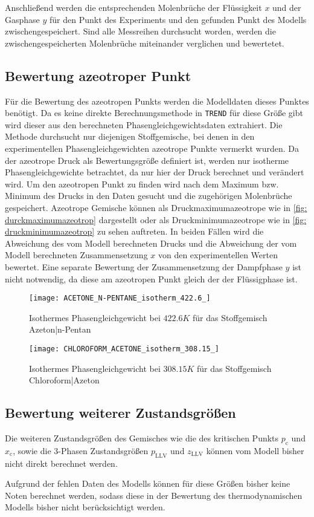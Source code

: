 \documentclass[../thesis.tex]{subfiles}
\begin{document}
Anschließend werden die entsprechenden Molenbrüche der Flüssigkeit $x$ und der Gasphase $y$ für den Punkt des Experiments und den gefunden Punkt des Modells zwischengespeichert. Sind alle Messreihen durchsucht worden, werden die zwischengespeicherten Molenbrüche miteinander verglichen und bewertetet.

\subsection{Bewertung azeotroper Punkt}

Für die Bewertung des azeotropen Punkts werden die Modelldaten dieses Punktes benötigt. Da es keine direkte Berechnungsmethode in \texttt{TREND} für diese Größe gibt wird dieser aus den berechneten Phasengleichgewichtsdaten extrahiert. Die Methode durchsucht nur diejenigen Stoffgemische, bei denen in den experimentellen Phasengleichgewichten azeotrope Punkte vermerkt wurden. Da der azeotrope Druck als Bewertungsgröße definiert ist, werden nur isotherme Phasengleichgewichte betrachtet, da nur hier der Druck berechnet und verändert wird. Um den azeotropen Punkt zu finden wird nach dem Maximum bzw. Minimum des Drucks in den Daten gesucht und die zugehörigen Molenbrüche gespeichert. Azeotrope Gemische können als Druckmaximumazeotrope wie in \autoref{fig: durckmaximumazeotrop} dargestellt oder als Druckminimumazeotrope wie in \autoref{fig: druckminimumazeotrop} zu sehen auftreten. In beiden Fällen wird die Abweichung des vom Modell berechneten Drucks und die Abweichung der vom Modell berechneten Zusammensetzung $x$ von den experimentellen Werten bewertet. Eine separate Bewertung der Zusammensetzung der Dampfphase $y$ ist nicht notwendig, da diese am azeotropen Punkt gleich der der Flüssigphase ist. 

\begin{figure}[htb]
	\centering
	\texttt{[image: ACETONE\_N-PENTANE\_isotherm\_422.6\_]}
	\caption{Isothermes Phasengleichgewicht bei $ 422$.$6 K$ für das Stoffgemisch Azeton|n-Pentan}
	\label{fig: durckmaximumazeotrop}
\end{figure}

\begin{figure}[hbt]
	\centering
	\texttt{[image: CHLOROFORM\_ACETONE\_isotherm\_308.15\_]}
	\caption{Isothermes Phasengleichgewicht bei $ 308$.$15 K$ für das Stoffgemisch Chloroform|Azeton}
	\label{fig: druckminimumazeotrop}
\end{figure}

\subsection{Bewertung weiterer Zustandsgrößen}

Die weiteren Zustandsgrößen des Gemisches wie die des kritischen Punkts $ p_{\mathrm{c}}$ und $ x_{\mathrm{c}}$, sowie die 3-Phasen Zustandsgrößen $p_{\mathrm{LLV}}$ und $z_{\mathrm{LLV}}$ können vom Modell bisher nicht direkt berechnet werden.

Aufgrund der fehlen Daten des Modells können für diese Größen bisher keine Noten berechnet werden, sodass diese in der Bewertung des thermodynamischen Modells bisher nicht berücksichtigt werden.
\end{document}
